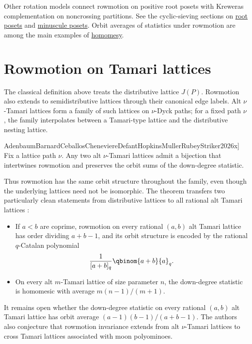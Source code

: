 Other rotation models connect rowmotion on positive root posets with
Kreweras complementation on noncrossing partitions.  See the cyclic-sieving
sections on \hyperref[cspListPosetsRoot]{root posets} and
\hyperref[cspListPosetsMinuscule]{minuscule posets}.  Orbit averages of
statistics under rowmotion are among the main examples of
\hyperref[homomesy]{homomesy}.

\section[rowmotionTamari]{Rowmotion on Tamari lattices}

The classical definition above treats the distributive lattice $J(P)$.
Rowmotion also extends to semidistributive lattices through their canonical
edge labels.  Alt $\nu$-Tamari lattices form a family of such lattices on
$\nu$-Dyck paths; for a fixed path $\nu$, the family interpolates between a
Tamari-type lattice and the distributive nesting lattice.

\begin{theorem}[Adenbaum--Barnard--Ceballos--Chenevière--Defant--Hopkins--Müller--Rubey--Striker,
\cite[Thm.~1.1]{AdenbaumBarnardCeballosCheneviereDefantHopkinsMullerRubeyStriker2026x}]
Fix a lattice path $\nu$.  Any two alt $\nu$-Tamari lattices admit a bijection
that intertwines rowmotion and preserves the orbit sums of the down-degree
statistic.
\end{theorem}

Thus rowmotion has the same orbit structure throughout the family, even
though the underlying lattices need not be isomorphic.  The theorem transfers
two particularly clean statements from distributive lattices to all rational
alt Tamari lattices
\cite[Thm.~5.1--5.2]{AdenbaumBarnardCeballosCheneviereDefantHopkinsMullerRubeyStriker2026x}:

\begin{itemize}
\item If $a\lt b$ are coprime, rowmotion on every rational $(a,b)$ alt Tamari
lattice has order dividing $a+b-1$, and its orbit structure is encoded by the
rational $q$-Catalan polynomial
\[
  \frac{1}{[a+b]_q}\qbinom{a+b}{a}_q.
\]
\item On every alt $m$-Tamari lattice of size parameter $n$, the down-degree
statistic is homomesic with average $m(n-1)/(m+1)$.
\end{itemize}

It remains open whether the down-degree statistic on every rational
$(a,b)$ alt Tamari lattice has orbit average
$(a-1)(b-1)/(a+b-1)$.  The authors also conjecture that rowmotion invariance
extends from alt $\nu$-Tamari lattices to cross Tamari lattices associated
with moon polyominoes.
